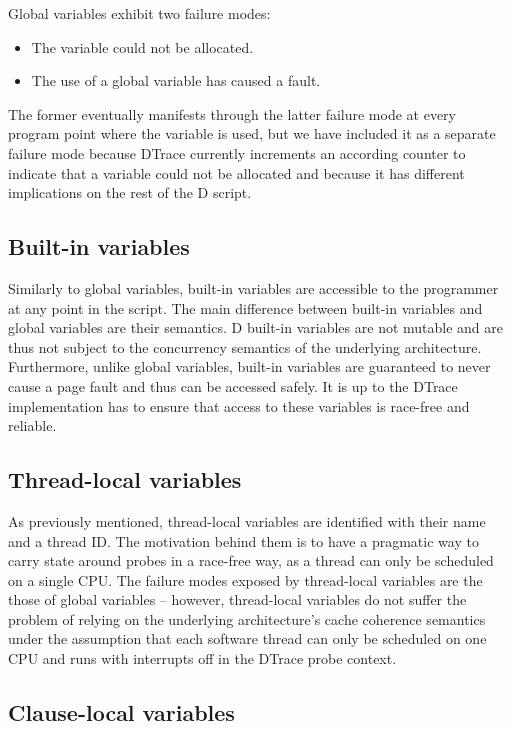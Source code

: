 Global variables exhibit two failure modes:
\begin{itemize}
\item The variable could not be allocated.
\item The use of a global variable has caused a fault.
\end{itemize}
The former eventually manifests through the latter failure mode at every program
point where the variable is used, but we have included it as a separate failure
mode because DTrace currently increments an according counter to indicate that a
variable could not be allocated and because it has different implications on the
rest of the D script.

\subsection{Built-in variables}
\label{subsec:builtin-variables}

Similarly to global variables, built-in variables are accessible to the
programmer at any point in the script. The main difference between built-in
variables and global variables are their semantics. D built-in variables are not
mutable and are thus not subject to the concurrency semantics of the underlying
architecture. Furthermore, unlike global variables, built-in variables are
guaranteed to never cause a page fault and thus can be accessed safely. It is up
to the DTrace implementation has to ensure that access to these variables is
race-free and reliable.

\subsection{Thread-local variables}
\label{subsec:thread-local-variables}

As previously mentioned, thread-local variables are identified with their name
and a thread ID. The motivation behind them is to have a pragmatic way to carry
state around probes in a race-free way, as a thread can only be scheduled on a
single CPU. The failure modes exposed by thread-local variables are the those of
global variables -- however, thread-local variables do not suffer the problem of
relying on the underlying architecture's cache coherence semantics under the
assumption that each software thread can only be scheduled on one CPU and runs
with interrupts off in the DTrace probe context.

\subsection{Clause-local variables}
\label{subsec:clause-local-variables}

